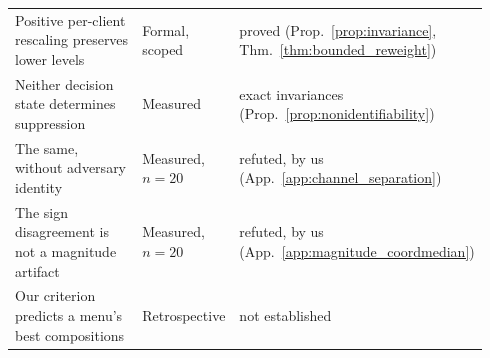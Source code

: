 \documentclass{article}
\begin{document}
\begin{table}[t]
\begin{tabular}{@{}p{0.51\linewidth}p{0.17\linewidth}p{0.26\linewidth}@{}}
Positive per-client rescaling preserves lower levels & Formal, scoped & proved (Prop.~\ref{prop:invariance}, Thm.~\ref{thm:bounded_reweight}) \\
Neither decision state determines suppression & Measured & exact invariances (Prop.~\ref{prop:nonidentifiability}) \\
The same, without adversary identity & Measured, $n{=}20$ & refuted, by us (App.~\ref{app:channel_separation}) \\
The sign disagreement is not a magnitude artifact & Measured, $n{=}20$ & refuted, by us (App.~\ref{app:magnitude_coordmedian}) \\
Our criterion predicts a menu's best compositions & Retrospective & not established \\
\bottomrule
\end{tabular}
\end{table}
\end{document}
